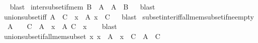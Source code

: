 \begin{isabellebody}
\isadelimproof
\ %
\endisadelimproof
%
\isatagproof
{}\isamarkupfalse%
\ blast%
\endisatagproof
{\isafoldproof}%
%
\isadelimproof
%
\endisadelimproof
\isanewline
\isanewline
{}\isamarkupfalse%
\ inter{\isacharunderscore}{\kern0pt}subset{\isacharunderscore}{\kern0pt}if{\isacharunderscore}{\kern0pt}mem{\isacharcolon}{\kern0pt}\ {\isachardoublequoteopen}B\ {\isasymin}\ A\ {\isasymLongrightarrow}\ {\isasymInter}A\ {\isasymsubseteq}\ B{\isachardoublequoteclose}%
\isadelimproof
\ %
\endisadelimproof
%
\isatagproof
{}\isamarkupfalse%
\ blast%
\endisatagproof
{\isafoldproof}%
%
\isadelimproof
%
\endisadelimproof
\isanewline
\isanewline
{}\isamarkupfalse%
\ union{\isacharunderscore}{\kern0pt}subset{\isacharunderscore}{\kern0pt}iff{\isacharcolon}{\kern0pt}\ {\isachardoublequoteopen}{\isasymUnion}A\ {\isasymsubseteq}\ C\ {\isasymlongleftrightarrow}\ {\isacharparenleft}{\kern0pt}{\isasymforall}x\ {\isasymin}\ A{\isachardot}{\kern0pt}\ x\ {\isasymsubseteq}\ C{\isacharparenright}{\kern0pt}{\isachardoublequoteclose}%
\isadelimproof
\ %
\endisadelimproof
%
\isatagproof
{}\isamarkupfalse%
\ blast%
\endisatagproof
{\isafoldproof}%
%
\isadelimproof
%
\endisadelimproof
\isanewline
\isanewline
{}\isamarkupfalse%
\ subset{\isacharunderscore}{\kern0pt}inter{\isacharunderscore}{\kern0pt}iff{\isacharunderscore}{\kern0pt}all{\isacharunderscore}{\kern0pt}mem{\isacharunderscore}{\kern0pt}subset{\isacharunderscore}{\kern0pt}if{\isacharunderscore}{\kern0pt}ne{\isacharunderscore}{\kern0pt}empty{\isacharcolon}{\kern0pt}\isanewline
\ \ {\isachardoublequoteopen}A\ {\isasymnoteq}\ {\isacharbraceleft}{\kern0pt}{\isacharbraceright}{\kern0pt}\ {\isasymLongrightarrow}\ C\ {\isasymsubseteq}\ {\isasymInter}A\ {\isasymlongleftrightarrow}\ {\isacharparenleft}{\kern0pt}{\isasymforall}x\ {\isasymin}\ A{\isachardot}{\kern0pt}\ C\ {\isasymsubseteq}\ x{\isacharparenright}{\kern0pt}{\isachardoublequoteclose}\isanewline
%
\isadelimproof
\ \ %
\endisadelimproof
%
\isatagproof
{}\isamarkupfalse%
\ blast%
\endisatagproof
{\isafoldproof}%
%
\isadelimproof
\isanewline
%
\endisadelimproof
\isanewline
{}\isamarkupfalse%
\ union{\isacharunderscore}{\kern0pt}subset{\isacharunderscore}{\kern0pt}if{\isacharunderscore}{\kern0pt}all{\isacharunderscore}{\kern0pt}mem{\isacharunderscore}{\kern0pt}subset{\isacharcolon}{\kern0pt}\ {\isachardoublequoteopen}{\isacharparenleft}{\kern0pt}{\isasymAnd}x{\isachardot}{\kern0pt}\ x\ {\isasymin}\ A\ {\isasymLongrightarrow}\ x\ {\isasymsubseteq}\ C{\isacharparenright}{\kern0pt}\ {\isasymLongrightarrow}\ {\isasymUnion}A\ {\isasymsubseteq}\ C{\isachardoublequoteclose}%

\end{isabellebody}
